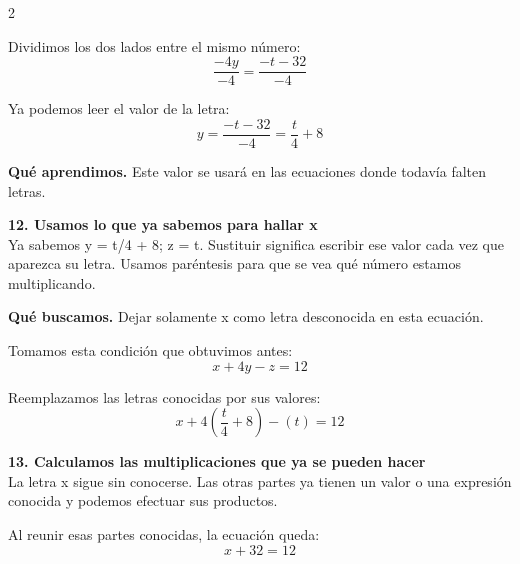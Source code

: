 \documentclass[11pt,a4paper,landscape]{article}
\begin{document}
\begin{multicols*}{2}
\begin{minipage}{\linewidth}
\par\smallskip Dividimos los dos lados entre el mismo número:
\[\frac{-4y}{-4}=\frac{- t - 32}{-4}\]
\par\smallskip Ya podemos leer el valor de la letra:
\[y=\frac{- t - 32}{-4}=\frac{t}{4} + 8\]
\par\smallskip\textbf{Qué aprendimos.} Este valor se usará en las ecuaciones donde todavía falten letras.
\end{minipage}\par\medskip
\noindent\begin{minipage}{\linewidth}\textbf{12. Usamos lo que ya sabemos para hallar x}\\[2pt]Ya sabemos y = t/4 + 8; z = t. Sustituir significa escribir ese valor cada vez que aparezca su letra. Usamos paréntesis para que se vea qué número estamos multiplicando.
\par\smallskip\textbf{Qué buscamos.} Dejar solamente x como letra desconocida en esta ecuación.
\par\smallskip Tomamos esta condición que obtuvimos antes:
\[x + 4y - z = 12\]
\par\smallskip Reemplazamos las letras conocidas por sus valores:
\[x + 4\left(\frac{t}{4} + 8\right) - \left(t\right)=12\]
\end{minipage}\par\medskip
\noindent\begin{minipage}{\linewidth}\textbf{13. Calculamos las multiplicaciones que ya se pueden hacer}\\[2pt]La letra x sigue sin conocerse. Las otras partes ya tienen un valor o una expresión conocida y podemos efectuar sus productos.
\par{}\par\smallskip
\par\smallskip Al reunir esas partes conocidas, la ecuación queda:
\[x + 32=12\]
\end{minipage}\par\medskip

\end{multicols*}
\end{document}
